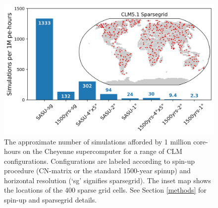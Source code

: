 \documentclass[draft]{agujournal2019}
\begin{document}
\begin{figure}[h]
\centering
\includegraphics[width=30pc]{../figs/main/sims.png}
\caption{The approximate number of simulations afforded by 1 million core-hours on the Cheyenne supercomputer for a range of CLM configurations. Configurations are labeled according to spin-up procedure (CN-matrix or the standard 1500-year spinup) and horizontal resolution (`sg' signifies sparsegrid). The inset map shows the locations of the 400 sparse grid cells. See Section \ref{methods} for spin-up and sparsegrid details.}
\label{fig:sims}
\end{figure}
\end{document}
